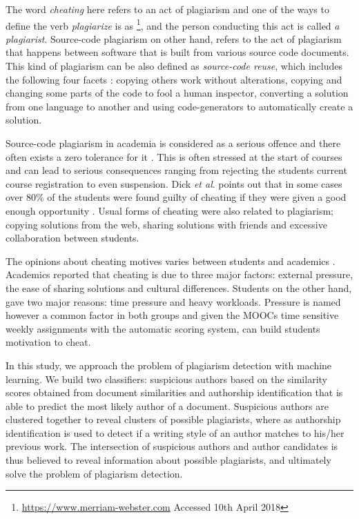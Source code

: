 \documentclass[english, grading]{tktltiki2}
\newcommand{\etal}{\textit{et al}. }
\theoremstyle{definition}
\theoremstyle{remark}
\numberwithin{equation}{section} %
\begin{document}
The word \emph{cheating} here refers to an act of plagiarism and one of the ways to define the verb \emph{plagiarize} is as \footnote{\url{https://www.merriam-webster.com} Accessed 10th April 2018}, and the person conducting this act is called \emph{a plagiarist}. Source-code plagiarism on other hand, refers to the act of plagiarism that happens between software that is built from various source code documents. This kind of plagiarism can be also defined as \emph{source-code reuse}, which includes the following four facets \cite{TDSCP2008}: copying others work without alterations, copying and changing some parts of the code to fool a human inspector, converting a solution from one language to another and using code-generators to automatically create a solution. 


Source-code plagiarism in academia is considered as a serious offence and there often exists a zero tolerance for it \cite{TDSCP2008}. This is often stressed at the start of courses and can lead to serious consequences ranging from rejecting the students current course registration to even suspension. Dick \etal points out that in some cases over 80\% of the students were found guilty of cheating if they were given a good enough opportunity \cite{Dick:2002:ASC:782941.783000}. Usual forms of cheating were also related to plagiarism; copying solutions from the web, sharing solutions with friends and excessive collaboration between students. 

The opinions about cheating motives varies between students and academics \cite{TDSCP2008}. Academics reported that cheating is due to three major factors: external pressure, the ease of sharing solutions and cultural differences. Students on the other hand, gave two major reasons: time pressure and heavy workloads. Pressure is named however a common factor in both groups and given the MOOCs time sensitive weekly assignments with the automatic scoring system, can build students motivation to cheat.

In this study, we approach the problem of plagiarism detection with machine learning. We build two classifiers: suspicious authors based on the similarity scores obtained from document similarities and authorship identification that is able to predict the most likely author of a document. Suspicious authors are clustered together to reveal clusters of possible plagiarists, where as authorship identification is used to detect if a writing style of an author matches to his/her previous work. The intersection of suspicious authors and author candidates is thus believed to reveal information about possible plagiarists, and ultimately solve the problem of plagiarism detection. 
\end{document}
